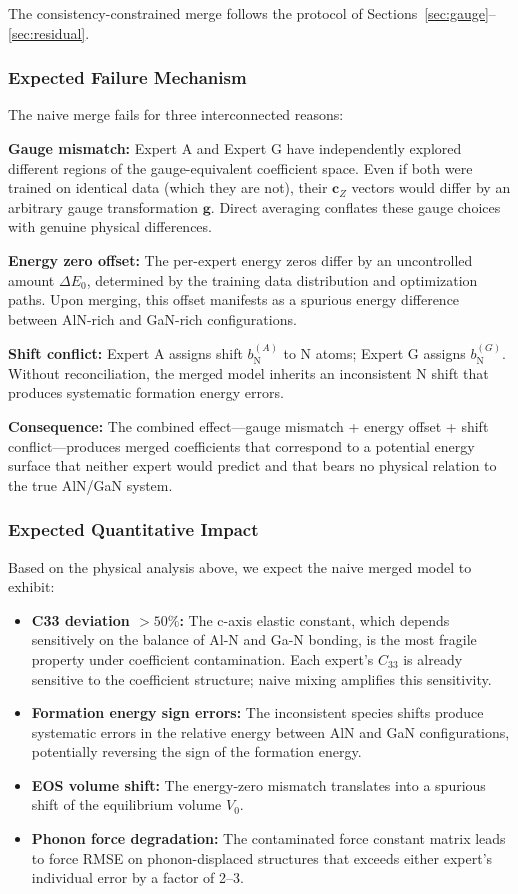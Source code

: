 \documentclass[twoside,prb,aps,floatfix,superscriptaddress,longbibliography]{revtex4-2}
\newcommand{\g}{\mathbf{g}}
\newcommand{\cZ}{\mathbf{c}_{Z}}
\begin{document}
The consistency-constrained merge follows the protocol of Sections~\ref{sec:gauge}--\ref{sec:residual}.

\subsubsection{Expected Failure Mechanism}

The naive merge fails for three interconnected reasons:

\textbf{Gauge mismatch:} Expert A and Expert G have independently explored different regions of the gauge-equivalent coefficient space. Even if both were trained on identical data (which they are not), their $\cZ$ vectors would differ by an arbitrary gauge transformation $\g$. Direct averaging conflates these gauge choices with genuine physical differences.

\textbf{Energy zero offset:} The per-expert energy zeros differ by an uncontrolled amount $\Delta E_0$, determined by the training data distribution and optimization paths. Upon merging, this offset manifests as a spurious energy difference between AlN-rich and GaN-rich configurations.

\textbf{Shift conflict:} Expert A assigns shift $b_{\mathrm{N}}^{(A)}$ to N atoms; Expert G assigns $b_{\mathrm{N}}^{(G)}$. Without reconciliation, the merged model inherits an inconsistent N shift that produces systematic formation energy errors.

\textbf{Consequence:} The combined effect---gauge mismatch + energy offset + shift conflict---produces merged coefficients that correspond to a potential energy surface that neither expert would predict and that bears no physical relation to the true AlN/GaN system.

\subsubsection{Expected Quantitative Impact}

Based on the physical analysis above, we expect the naive merged model to exhibit:

\begin{itemize}
    \item \textbf{C33 deviation $> 50\%$:} The c-axis elastic constant, which depends sensitively on the balance of Al-N and Ga-N bonding, is the most fragile property under coefficient contamination. Each expert's $C_{33}$ is already sensitive to the coefficient structure; naive mixing amplifies this sensitivity.
    \item \textbf{Formation energy sign errors:} The inconsistent species shifts produce systematic errors in the relative energy between AlN and GaN configurations, potentially reversing the sign of the formation energy.
    \item \textbf{EOS volume shift:} The energy-zero mismatch translates into a spurious shift of the equilibrium volume $V_0$.
    \item \textbf{Phonon force degradation:} The contaminated force constant matrix leads to force RMSE on phonon-displaced structures that exceeds either expert's individual error by a factor of 2--3.
\end{itemize}
\end{document}
